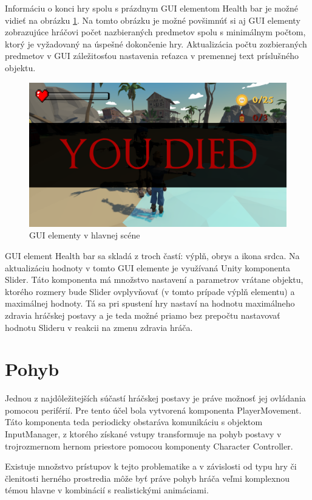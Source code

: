 \documentclass[slovak, master]{diploma}
\begin{document}
Informáciu o konci hry spolu s prázdnym GUI elementom Health bar je možné vidieť na obrázku \ref{pic:YouDied}. Na tomto obrázku je možné povšimnúť si aj GUI elementy zobrazujúce hráčovi počet nazbieraných predmetov spolu s minimálnym počtom, ktorý je vyžadovaný na úspešné dokončenie hry. Aktualizácia počtu zozbieraných predmetov v GUI záležitosťou nastavenia reťazca v premennej text príslušného objektu. 

\begin{figure}[!htbp]
	\centering
	\includegraphics[width=.8\textwidth]{Figures/youDied.png}
	\caption{GUI elementy v hlavnej scéne}
	\label{pic:YouDied}
\end{figure}

GUI element Health bar sa skladá z troch častí: výplň, obrys a ikona srdca. Na aktualizáciu hodnoty v tomto GUI elemente je využívaná Unity komponenta Slider. Táto komponenta má množstvo nastavení a parametrov vrátane objektu, ktorého rozmery bude Slider ovplyvňovať (v tomto prípade výplň elementu) a maximálnej hodnoty. Tá sa pri spustení hry nastaví na hodnotu maximálneho zdravia hráčskej postavy a je teda možné priamo bez prepočtu nastavovať hodnotu Slideru v reakcii na zmenu zdravia hráča.

\section{Pohyb}
\label{sec:PlayerMovement} 
Jednou z najdôležitejších súčastí hráčskej postavy je práve možnosť jej ovládania pomocou periférií. Pre tento účel bola vytvorená komponenta PlayerMovement. Táto komponenta teda periodicky obstaráva komunikáciu s objektom InputManager, z ktorého získané vstupy transformuje na pohyb postavy v trojrozmernom hernom priestore pomocou komponenty Character Controller.

Existuje množstvo prístupov k tejto problematike a v závislosti od typu hry či členitosti herného prostredia môže byť práve pohyb hráča veľmi komplexnou témou hlavne v kombinácií s realistickými animáciami.
\end{document}
